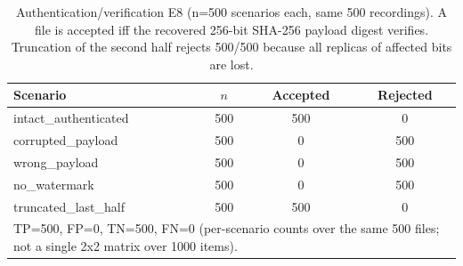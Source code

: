 \begin{table}[t]
\centering
\caption{Authentication/verification E8 (n=500 scenarios each, same 500 recordings). A file is accepted iff the recovered 256-bit SHA-256 payload digest verifies. Truncation of the second half rejects 500/500 because all replicas of affected bits are lost.}
\label{tab:auth-e8}
\scriptsize
\begin{tabular}{lccc}
\toprule
\textbf{Scenario} & \textbf{$n$} & \textbf{Accepted} & \textbf{Rejected} \\
\midrule
intact_authenticated & 500 & 500 & 0 \\
corrupted_payload & 500 & 0 & 500 \\
wrong_payload & 500 & 0 & 500 \\
no_watermark & 500 & 0 & 500 \\
truncated_last_half & 500 & 500 & 0 \\
\bottomrule
\multicolumn{4}{l}{\footnotesize TP=500, FP=0, TN=500, FN=0 (per-scenario counts over the same 500 files; not a single 2x2 matrix over 1000 items).}\\
\end{tabular}
\end{table}
